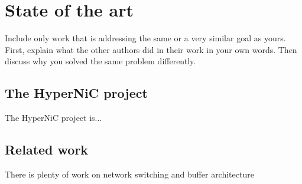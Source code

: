 \chapter{State of the art}
Include only work that is addressing the same or a very similar goal as
yours.  First, explain what the other authors did in their work in your
own words. Then discuss why you solved the same problem differently.


\section{The HyperNiC project}
The HyperNiC project is...

\section{Related work}
There is plenty of work on network switching and buffer architecture


